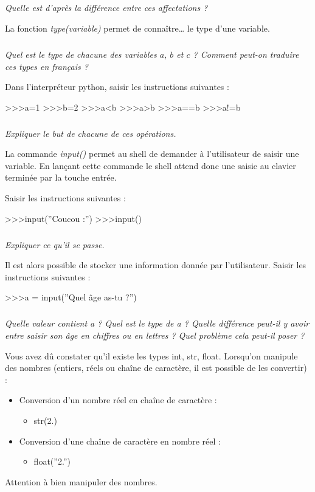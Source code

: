 \documentclass[10pt]{article}
\begin{document}
\subparagraph{} 
\textit{Quelle est d'après la différence entre ces affectations ?}

La fonction \textsl{type(variable)} permet de connaître… le type d’une variable. 


\subparagraph{} 
\textit{Quel est le type de chacune des variables $a$, $b$ et $c$ ? Comment peut-on traduire ces types en français ?}

Dans l'interpréteur python, saisir les instructions suivantes :
\begin{py}
\begin{python}
>>>a=1
>>>b=2
>>>a<b
>>>a>b
>>>a==b
>>>a!=b
\end{python}
\end{py}

\subparagraph{} 
\textit{Expliquer le but de chacune de ces opérations.}


La commande \textsl{input()} permet au shell de demander à l’utilisateur de saisir une variable. En lançant cette commande le shell attend donc une saisie au clavier terminée par la touche entrée. 

Saisir les instructions suivantes : 
\begin{py}
\begin{python}
>>>input(''Coucou :'')
>>>input()
\end{python}
\end{py}

\subparagraph{} 
\textit{Expliquer ce qu’il se passe.}


Il est alors possible de stocker une information donnée par l’utilisateur. Saisir les instructions suivantes : 

\begin{py}
\begin{python}
>>>a = input(''Quel âge as-tu ?'')
\end{python}
\end{py}

\subparagraph{} 
\textit{Quelle valeur contient a ? Quel est le type de a ? Quelle différence peut-il y avoir entre saisir son âge en chiffres ou en lettres ? Quel problème cela peut-il poser ?}


\begin{rem}
Vous avez dû constater qu’il existe les types int, str, float. Lorsqu’on manipule des nombres (entiers, réels ou chaîne de caractère, il est possible de les convertir) :
\begin{itemize}
\item Conversion d’un nombre réel en chaîne de caractère :
\begin{itemize}
\item \textsf{str(2.)}
\end{itemize}
\item Conversion d’une chaîne de caractère en nombre réel : 
\begin{itemize}
\item \textsf{float(''2.'')}
\end{itemize}
\end{itemize}
Attention à bien manipuler des nombres.
\end{rem}
\end{document}
